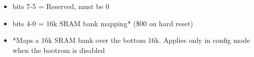 \begin{itemize}
\item bits 7-5 = Reserved, must be 0
\item bits 4-0 = 16k SRAM bank mapping* (\$00 on hard reset)
\item[] *Maps a 16k SRAM bank over the bottom 16k. Applies only in
  config mode when the bootrom is disabled
\end{itemize}

